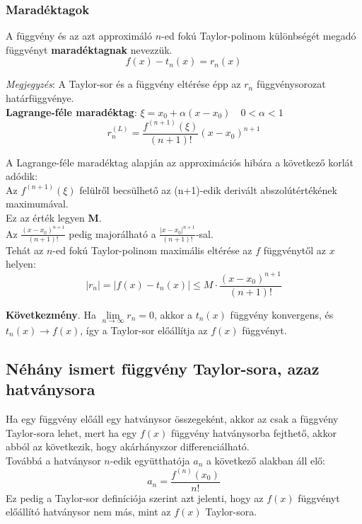 \documentclass[tikz,12pt,margin=0px]{article}
\newcommand\ddfrac[2]{\frac{\displaystyle #1}{\displaystyle #2}}
\begin{document}
    \subsubsection*{Maradéktagok\\}

    A függvény és az azt approximáló $n$-ed fokú Taylor-polinom különbségét megadó függvényt \textbf{maradéktagnak} nevezzük.
    \[
        f(x) - t_{n}(x) = r_{n}(x)
    \]

    \noindent \emph{Megjegyzés}: A Taylor-sor és a függvény eltérése épp az $r_{n}$ függvénysorozat határfüggvénye.\\

    \noindent \textbf{Lagrange-féle maradéktag}: $\xi = x_0 + \alpha(x-x_0) \quad 0 < \alpha < 1$
    \[
        r_{n}^{(L)} = \ddfrac{f^{(n+1)}(\xi)}{(n+1)!}(x-x_{0})^{n+1}
    \]
\newpage

    \noindent A Lagrange-féle maradéktag alapján az approximációs hibára a következő korlát adódik:\\
    
    \noindent Az $f^{(n+1)}(\xi)$ felülről becsülhető az (n+1)-edik derivált abszolútértékének maximumával.\\
    Ez az érték legyen \textbf{M}.\\
    
    \noindent Az $\ddfrac{(x-x_{0})^{n+1}}{(n+1)!}$ pedig majorálható a $\ddfrac{|x-x_{0}|^{n+1}}{(n+1)!}$-sal.\\
    
    \noindent Tehát az $n$-ed fokú Taylor-polinom maximális eltérése az $f$ függvénytől az $x$ helyen:
    \[
        \Big|r_{n}\Big| = \Big|f(x)-t_{n}(x)\Big| \leq M \cdot \ddfrac{(x-x_{0})^{n+1}}{(n+1)!}
    \]

    \noindent \textbf{Következmény}. Ha $\lim\limits_{n \to \infty}r_{n} = 0$, akkor a $t_{n}(x)$ függvény konvergens, és $t_{n}(x) \to f(x)$, így a Taylor-sor előállítja az $f(x)$ függvényt.

	\subsection*{Néhány ismert függvény Taylor-sora, azaz hatványsora\\}
	
    \noindent Ha egy függvény előáll egy hatványsor összegeként, akkor az csak a függvény Taylor-sora lehet, mert ha egy $f(x)$ függvény hatványsorba fejthető, akkor abból az következik, hogy akárhányszor differenciálható.\\
    Továbbá a hatványsor $n$-edik együtthatója $a_n$ a következő alakban áll elő: 
    \[
        a_{n} = \ddfrac{f^{(n)}(x_{0})}{n!}
    \]
    Ez pedig a Taylor-sor definíciója szerint azt jelenti, hogy az $f(x)$ függvényt előállító hatványsor nem más, mint az $f(x)$ Taylor-sora.\\
\end{document}
